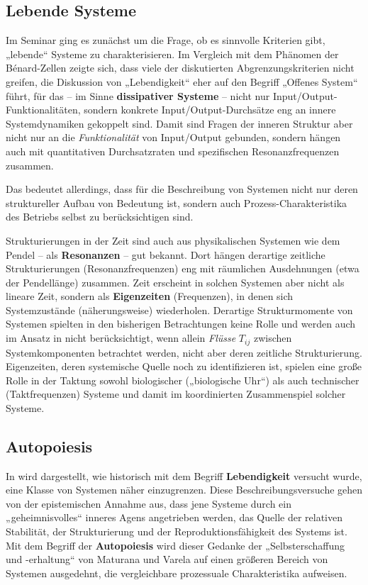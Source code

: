 \documentclass[11pt,a4paper]{article}
\begin{document}
\subsection{Lebende Systeme}

Im Seminar ging es zunächst um die Frage, ob es sinnvolle Kriterien gibt,
„lebende“ Systeme zu charakterisieren. Im Vergleich mit dem Phänomen der
Bénard-Zellen zeigte sich, dass viele der diskutierten Abgrenzungskriterien
nicht greifen, die Diskussion von „Lebendigkeit“ eher auf den Begriff „Offenes
System“ führt, für das -- im Sinne \textbf{dissipativer Systeme} -- nicht nur
Input/Output-Funktionalitäten, sondern konkrete Input/Output-Durchsätze eng an
innere Systemdynamiken gekoppelt sind. Damit sind Fragen der inneren Struktur
aber nicht nur an die \emph{Funktionalität} von Input/Output gebunden, sondern
hängen auch mit quantitativen Durchsatzraten und spezifischen
Resonanzfrequenzen zusammen.

Das bedeutet allerdings, dass für die Beschreibung von Systemen nicht nur
deren struktureller Aufbau von Bedeutung ist, sondern auch
Prozess-Charakteristika des Betriebs selbst zu berücksichtigen sind.

Strukturierungen in der Zeit sind auch aus physikalischen Systemen wie dem
Pendel -- als \textbf{Resonanzen} -- gut bekannt. Dort hängen derartige
zeitliche Strukturierungen (Resonanzfrequenzen) eng mit räumlichen
Ausdehnungen (etwa der Pendellänge) zusammen. Zeit erscheint in solchen
Systemen aber nicht als lineare Zeit, sondern als \textbf{Eigenzeiten}
(Frequenzen), in denen sich Systemzustände (näherungsweise)
wiederholen. Derartige Strukturmomente von Systemen spielten in den bisherigen
Betrachtungen keine Rolle und werden auch im Ansatz in \cite{Ulanowicz2009}
nicht berücksichtigt, wenn allein \emph{Flüsse} $T_{ij}$ zwischen
Systemkomponenten betrachtet werden, nicht aber deren zeitliche
Strukturierung.  Eigenzeiten, deren systemische Quelle noch zu identifizieren
ist, spielen eine große Rolle in der Taktung sowohl biologischer („biologische
Uhr“) als auch technischer (Taktfrequenzen) Systeme und damit im koordinierten
Zusammenspiel solcher Systeme.

\subsection{Autopoiesis}

In \cite{Mingers1989} wird dargestellt, wie historisch mit dem Begriff
\textbf{Lebendigkeit} versucht wurde, eine Klasse von Systemen näher
einzugrenzen. Diese Beschreibungsversuche gehen von der epistemischen Annahme
aus, dass jene Systeme durch ein „geheimnisvolles“ inneres Agens angetrieben
werden, das Quelle der relativen Stabilität, der Strukturierung und der
Reproduktionsfähigkeit des Systems ist. Mit dem Begriff der
\textbf{Autopoiesis} wird dieser Gedanke der „Selbsterschaffung und
-erhaltung“ von Maturana und Varela auf einen größeren Bereich von Systemen
ausgedehnt, die vergleichbare prozessuale Charakteristika aufweisen.
\end{document}
